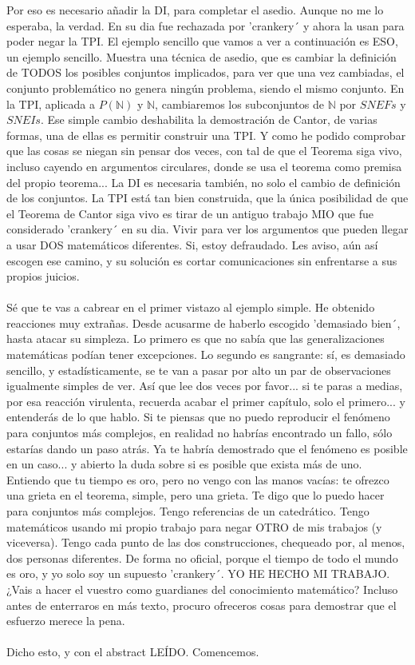 	\noindent
	Por eso es necesario añadir la DI, para completar el asedio. Aunque no me lo esperaba, la verdad. En su dia fue rechazada por 'crankery´ y ahora la usan para poder negar la TPI. El ejemplo sencillo que vamos a ver a continuación es ESO, un ejemplo sencillo. Muestra una técnica de asedio, que es cambiar la definición de TODOS los posibles conjuntos implicados, para ver que una vez cambiadas, el conjunto problemático no genera ningún problema, siendo el mismo conjunto. En la TPI, aplicada a $P(\mathbb{N})$ y $\mathbb{N}$, cambiaremos los subconjuntos de $\mathbb{N}$ por $SNEFs$ y $SNEIs$. Ese simple cambio deshabilita la demostración de Cantor, de varias formas, una de ellas es permitir construir una TPI. Y como he podido comprobar que las cosas se niegan sin pensar dos veces, con tal de que el Teorema siga vivo, incluso cayendo en argumentos circulares, donde se usa el teorema como premisa del propio teorema... La DI es necesaria también, no solo el cambio de definición de los conjuntos. La TPI está tan bien construida, que la única posibilidad de que el Teorema de Cantor siga vivo es tirar de un antiguo trabajo MIO que fue considerado 'crankery´ en su dia. Vivir para ver los argumentos que pueden llegar a usar DOS matemáticos diferentes. Si, estoy defraudado. Les aviso, aún así escogen ese camino, y su solución es cortar comunicaciones sin enfrentarse a sus propios juicios.\\\\
	
	\noindent
	Sé que te vas a cabrear en el primer vistazo al ejemplo simple. He obtenido reacciones muy extrañas. Desde acusarme de haberlo escogido 'demasiado bien´, hasta atacar su simpleza. Lo primero es que no sabía que las generalizaciones matemáticas podían tener excepciones. Lo segundo es sangrante: sí, es demasiado sencillo, y estadísticamente, se te van a pasar por alto un par de observaciones igualmente simples de ver. Así que lee dos veces por favor... si te paras a medias, por esa reacción virulenta, recuerda acabar el primer capítulo, solo el primero... y entenderás de lo que hablo. Si te piensas que no puedo reproducir el fenómeno para conjuntos más complejos, en realidad no habrías encontrado un fallo, sólo estarías dando un paso atrás. Ya te habría demostrado que el fenómeno es posible en un caso... y abierto la duda sobre si es posible que exista más de uno. Entiendo que tu tiempo es oro, pero no vengo con las manos vacías: te ofrezco una grieta en el teorema, simple, pero una grieta. Te digo que lo puedo hacer para conjuntos más complejos. Tengo referencias de un catedrático. Tengo matemáticos usando mi propio trabajo para negar OTRO de mis trabajos (y viceversa). Tengo cada punto de las dos construcciones, chequeado por, al menos, dos personas diferentes. De forma no oficial, porque el tiempo de todo el mundo es oro, y yo solo soy un supuesto 'crankery´. YO HE HECHO MI TRABAJO. ¿Vais a hacer el vuestro como guardianes del conocimiento matemático? Incluso antes de enterraros en más texto, procuro ofreceros cosas para demostrar que el esfuerzo merece la pena.
	\\\\ 
	
	\noindent
	Dicho esto, y con el abstract LEÍDO. Comencemos.
	
	




